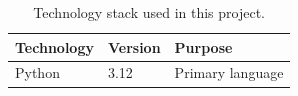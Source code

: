 \begin{table}[htbp]
\centering
\caption{Technology stack used in this project.}
\label{tab:ch3:tech_stack}
\begin{tabular}{lll}
\toprule
\textbf{Technology} & \textbf{Version} & \textbf{Purpose} \\
\midrule
Python & 3.12 & Primary language \\
\bottomrule
\end{tabular}
\end{table}
